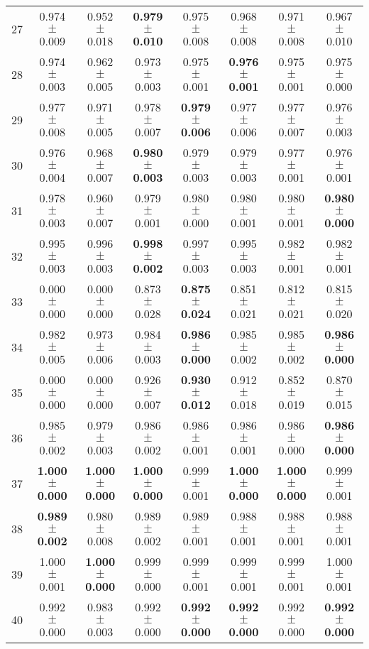\begin{table}[!ht]
{\begin{tabular}{r c c c c c c c}
27 & 0.974 $\pm$ 0.009 & 0.952 $\pm$ 0.018 & \textbf{0.979 $\pm$ 0.010} & 0.975 $\pm$ 0.008 & 0.968 $\pm$ 0.008 & 0.971 $\pm$ 0.008 & 0.967 $\pm$ 0.010 \\
28 & 0.974 $\pm$ 0.003 & 0.962 $\pm$ 0.005 & 0.973 $\pm$ 0.003 & 0.975 $\pm$ 0.001 & \textbf{0.976 $\pm$ 0.001} & 0.975 $\pm$ 0.001 & 0.975 $\pm$ 0.000 \\
29 & 0.977 $\pm$ 0.008 & 0.971 $\pm$ 0.005 & 0.978 $\pm$ 0.007 & \textbf{0.979 $\pm$ 0.006} & 0.977 $\pm$ 0.006 & 0.977 $\pm$ 0.007 & 0.976 $\pm$ 0.003 \\
30 & 0.976 $\pm$ 0.004 & 0.968 $\pm$ 0.007 & \textbf{0.980 $\pm$ 0.003} & 0.979 $\pm$ 0.003 & 0.979 $\pm$ 0.003 & 0.977 $\pm$ 0.001 & 0.976 $\pm$ 0.001 \\
31 & 0.978 $\pm$ 0.003 & 0.960 $\pm$ 0.007 & 0.979 $\pm$ 0.001 & 0.980 $\pm$ 0.000 & 0.980 $\pm$ 0.001 & 0.980 $\pm$ 0.001 & \textbf{0.980 $\pm$ 0.000} \\
32 & 0.995 $\pm$ 0.003 & 0.996 $\pm$ 0.003 & \textbf{0.998 $\pm$ 0.002} & 0.997 $\pm$ 0.003 & 0.995 $\pm$ 0.003 & 0.982 $\pm$ 0.001 & 0.982 $\pm$ 0.001 \\
33 & 0.000 $\pm$ 0.000 & 0.000 $\pm$ 0.000 & 0.873 $\pm$ 0.028 & \textbf{0.875 $\pm$ 0.024} & 0.851 $\pm$ 0.021 & 0.812 $\pm$ 0.021 & 0.815 $\pm$ 0.020 \\
34 & 0.982 $\pm$ 0.005 & 0.973 $\pm$ 0.006 & 0.984 $\pm$ 0.003 & \textbf{0.986 $\pm$ 0.000} & 0.985 $\pm$ 0.002 & 0.985 $\pm$ 0.002 & \textbf{0.986 $\pm$ 0.000} \\
35 & 0.000 $\pm$ 0.000 & 0.000 $\pm$ 0.000 & 0.926 $\pm$ 0.007 & \textbf{0.930 $\pm$ 0.012} & 0.912 $\pm$ 0.018 & 0.852 $\pm$ 0.019 & 0.870 $\pm$ 0.015 \\
36 & 0.985 $\pm$ 0.002 & 0.979 $\pm$ 0.003 & 0.986 $\pm$ 0.002 & 0.986 $\pm$ 0.001 & 0.986 $\pm$ 0.001 & 0.986 $\pm$ 0.000 & \textbf{0.986 $\pm$ 0.000} \\
37 & \textbf{1.000 $\pm$ 0.000} & \textbf{1.000 $\pm$ 0.000} & \textbf{1.000 $\pm$ 0.000} & 0.999 $\pm$ 0.001 & \textbf{1.000 $\pm$ 0.000} & \textbf{1.000 $\pm$ 0.000} & 0.999 $\pm$ 0.001 \\
38 & \textbf{0.989 $\pm$ 0.002} & 0.980 $\pm$ 0.008 & 0.989 $\pm$ 0.002 & 0.989 $\pm$ 0.001 & 0.988 $\pm$ 0.001 & 0.988 $\pm$ 0.001 & 0.988 $\pm$ 0.001 \\
39 & 1.000 $\pm$ 0.001 & \textbf{1.000 $\pm$ 0.000} & 0.999 $\pm$ 0.000 & 0.999 $\pm$ 0.001 & 0.999 $\pm$ 0.001 & 0.999 $\pm$ 0.001 & 1.000 $\pm$ 0.001 \\
40 & 0.992 $\pm$ 0.000 & 0.983 $\pm$ 0.003 & 0.992 $\pm$ 0.000 & \textbf{0.992 $\pm$ 0.000} & \textbf{0.992 $\pm$ 0.000} & 0.992 $\pm$ 0.000 & \textbf{0.992 $\pm$ 0.000} \\
\end{tabular}}
\end{table}
